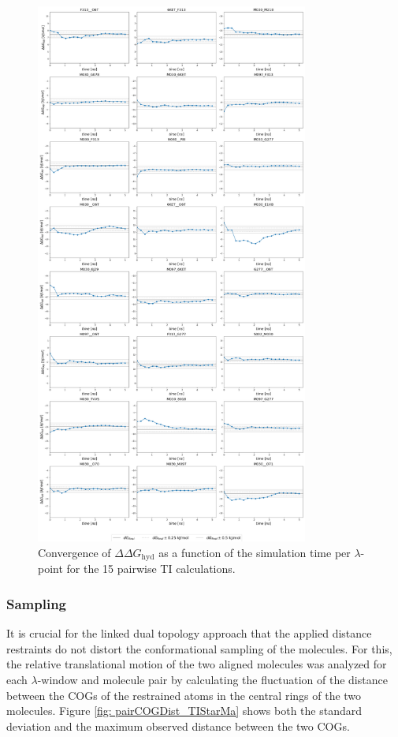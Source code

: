 \begin{figure}[H]
    \centering
    \includegraphics[width=0.8\textwidth]{fig/SI/dG_convergence/ddG_TI_convergence.png}
    \caption{Convergence of $\Delta \Delta G_\text{hyd}$ as a function of the simulation time per $\lambda$-point for the 15 pairwise TI calculations.}
    \label{fig: SI_figure df_convergence_TI}
\end{figure}


\subsubsection{Sampling}
It is crucial for the linked dual topology approach that the applied distance restraints do not distort the conformational sampling of the molecules. 
For this, the relative translational motion of the two aligned molecules was analyzed for each $\lambda$-window and molecule pair by calculating the fluctuation of the distance between the COGs of the restrained atoms in the central rings of the two molecules. Figure \ref{fig: pairCOGDist_TIStarMa} shows both the standard deviation and the maximum observed distance between the two COGs. 


